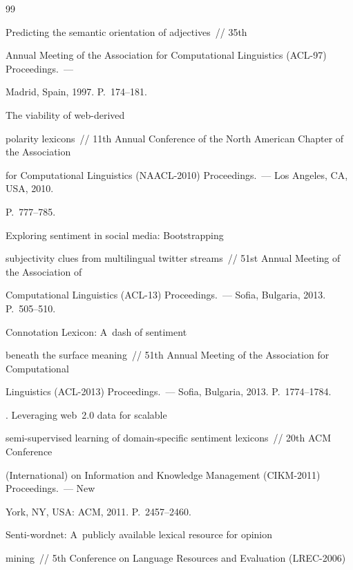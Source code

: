 {{\begin{thebibliography}{99}


 Predicting the semantic orientation of adjectives~/\!\!/ 35th


Annual Meeting of the Association for Computational Linguistics (ACL-97) Proceedings.~---


Madrid, Spain, 1997. P.~174--181.




 The viability of web-derived


polarity lexicons~/\!\!/  11th Annual Conference of the North American Chapter of the Association


for Computational Linguistics (NAACL-2010) Proceedings.~--- Los Angeles, CA, USA, 2010.


P.~777--785.




 Exploring sentiment in social media: Bootstrapping


subjectivity clues from multilingual twitter streams~/\!\!/ 51st Annual Meeting of the Association of


Computational Linguistics (ACL-13) Proceedings.~--- Sofia, Bulgaria, 2013. P.~505--510.




 Connotation Lexicon: A~dash of sentiment


beneath the surface meaning~/\!\!/ 51th Annual Meeting of the Association for Computational


Linguistics (ACL-2013) Proceedings.~--- Sofia, Bulgaria, 2013. P.~1774--1784.




. Leveraging web~2.0 data for scalable


semi-supervised learning of domain-specific sentiment lexicons~/\!\!/ 20th ACM Conference


(International) on Information and Knowledge Management (CIKM-2011) Proceedings.~--- New


York, NY, USA: ACM, 2011. P.~2457--2460.




 Senti-wordnet: A~publicly available lexical resource for opinion


mining~/\!\!/ 5th Conference on Language Resources and Evaluation (LREC-2006)



\end{thebibliography}}}
